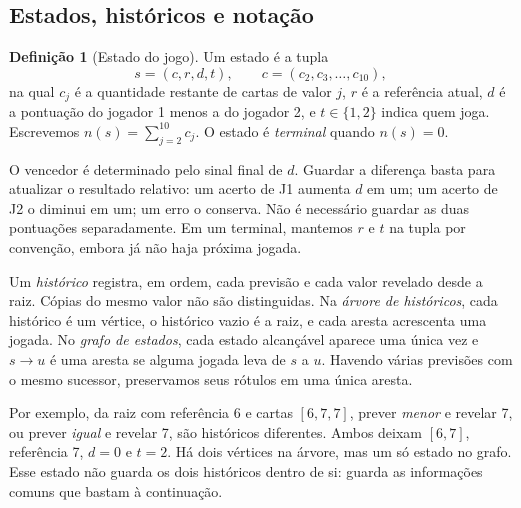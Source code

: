 \documentclass[11pt,a4paper]{article}
\theoremstyle{definition}
\newtheorem{definicao}{Definição}[section]
\newcommand{\proxpagina}{\newpage}
\begin{document}
\proxpagina
\subsection{Estados, históricos e notação}
\begin{definicao}[Estado do jogo]
Um estado é a tupla
\[
s=(c,r,d,t),\qquad c=(c_2,c_3,\ldots,c_{10}),
\]
na qual $c_j$ é a quantidade restante de cartas de valor $j$, $r$ é a referência atual, $d$ é a pontuação do jogador 1 menos a do jogador 2, e $t\in\{1,2\}$ indica quem joga. Escrevemos $n(s)=\sum_{j=2}^{10}c_j$. O estado é \emph{terminal} quando $n(s)=0$.
\end{definicao}

O vencedor é determinado pelo sinal final de $d$. Guardar a diferença basta para atualizar o resultado relativo: um acerto de J1 aumenta $d$ em um; um acerto de J2 o diminui em um; um erro o conserva. Não é necessário guardar as duas pontuações separadamente. Em um terminal, mantemos $r$ e $t$ na tupla por convenção, embora já não haja próxima jogada.

Um \emph{histórico} registra, em ordem, cada previsão e cada valor revelado desde a raiz. Cópias do mesmo valor não são distinguidas. Na \emph{árvore de históricos}, cada histórico é um vértice, o histórico vazio é a raiz, e cada aresta acrescenta uma jogada. No \emph{grafo de estados}, cada estado alcançável aparece uma única vez e $s\to u$ é uma aresta se alguma jogada leva de $s$ a $u$. Havendo várias previsões com o mesmo sucessor, preservamos seus rótulos em uma única aresta.

Por exemplo, da raiz com referência 6 e cartas $[6,7,7]$, prever \emph{menor} e revelar 7, ou prever \emph{igual} e revelar 7, são históricos diferentes. Ambos deixam $[6,7]$, referência 7, $d=0$ e $t=2$. Há dois vértices na árvore, mas um só estado no grafo. Esse estado não guarda os dois históricos dentro de si: guarda as informações comuns que bastam à continuação.
\end{document}
